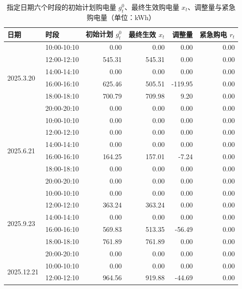 
\begin{table}[htbp]
  \centering
  \caption{指定日期六个时段的初始计划购电量 $g^0_t$、最终生效购电量 $x_t$、调整量与紧急购电量（单位：kWh）}
  \label{tab:p3-buy}
  \footnotesize
  \begin{tabular}{llrrrr}
    \toprule
    日期 & 时段 & 初始计划 $g^0_t$ & 最终生效 $x_t$ & 调整量 & 紧急购电 $r_t$ \\
    \midrule
    \multirow{6}{*}{2025.3.20} & 10{:}00-10{:}10 & 0.00 & 0.00 & 0.00 & 0.00 \\
     & 12{:}00-12{:}10 & 545.31 & 545.31 & 0.00 & 0.00 \\
     & 14{:}00-14{:}10 & 0.00 & 0.00 & 0.00 & 0.00 \\
     & 16{:}00-16{:}10 & 625.46 & 505.51 & -119.95 & 0.00 \\
     & 18{:}00-18{:}10 & 700.79 & 709.98 & 9.20 & 0.00 \\
     & 20{:}00-20{:}10 & 0.00 & 0.00 & 0.00 & 0.00 \\
    \midrule
    \multirow{6}{*}{2025.6.21} & 10{:}00-10{:}10 & 0.00 & 0.00 & 0.00 & 0.00 \\
     & 12{:}00-12{:}10 & 0.00 & 0.00 & 0.00 & 0.00 \\
     & 14{:}00-14{:}10 & 0.00 & 0.00 & 0.00 & 0.00 \\
     & 16{:}00-16{:}10 & 164.25 & 157.01 & -7.24 & 0.00 \\
     & 18{:}00-18{:}10 & 0.00 & 0.00 & 0.00 & 0.00 \\
     & 20{:}00-20{:}10 & 0.00 & 0.00 & 0.00 & 0.00 \\
    \midrule
    \multirow{6}{*}{2025.9.23} & 10{:}00-10{:}10 & 0.00 & 0.00 & 0.00 & 0.00 \\
     & 12{:}00-12{:}10 & 363.24 & 363.24 & 0.00 & 0.00 \\
     & 14{:}00-14{:}10 & 0.00 & 0.00 & 0.00 & 0.00 \\
     & 16{:}00-16{:}10 & 569.83 & 513.35 & -56.49 & 0.00 \\
     & 18{:}00-18{:}10 & 761.89 & 761.89 & 0.00 & 0.00 \\
     & 20{:}00-20{:}10 & 0.00 & 0.00 & 0.00 & 0.00 \\
    \midrule
    \multirow{6}{*}{2025.12.21} & 10{:}00-10{:}10 & 0.00 & 0.00 & 0.00 & 0.00 \\
     & 12{:}00-12{:}10 & 964.56 & 919.88 & -44.69 & 0.00 \\

\end{tabular}
\end{table}
